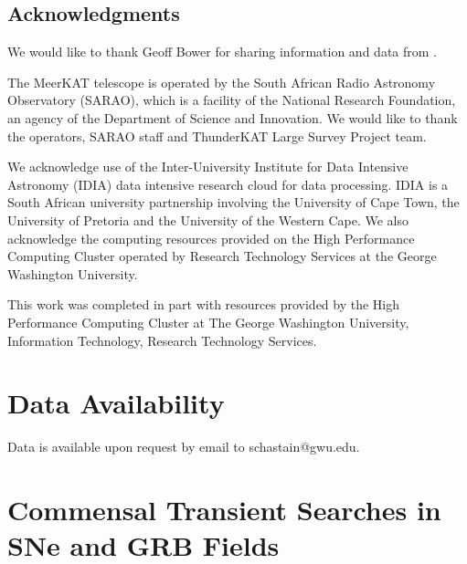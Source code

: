 \documentclass[12pt]{article}
\begin{document}
\subsection{Acknowledgments}
We would like to thank Geoff Bower for sharing information and data from \citet{2011ApJ...728L..14B}. 

The MeerKAT telescope is operated by the South African Radio Astronomy Observatory (SARAO), which is a facility of the National Research Foundation, an agency of the Department of Science and Innovation. We would like to thank the operators, SARAO staff and ThunderKAT Large Survey Project team.

We acknowledge use of the Inter-University Institute for Data Intensive Astronomy (IDIA) data intensive research cloud for data processing. IDIA is a South African university partnership involving the University of Cape Town, the University of Pretoria and the University of the Western Cape. We also acknowledge the computing resources provided on the High Performance Computing Cluster operated by Research Technology Services at the George Washington University.

This work was completed in part with resources provided by the High Performance Computing Cluster at The George Washington University, Information Technology, Research Technology Services.


\section*{Data Availability}


Data is available upon request by email to schastain@gwu.edu.






\section{Commensal Transient Searches in SNe and GRB Fields}
\end{document}
